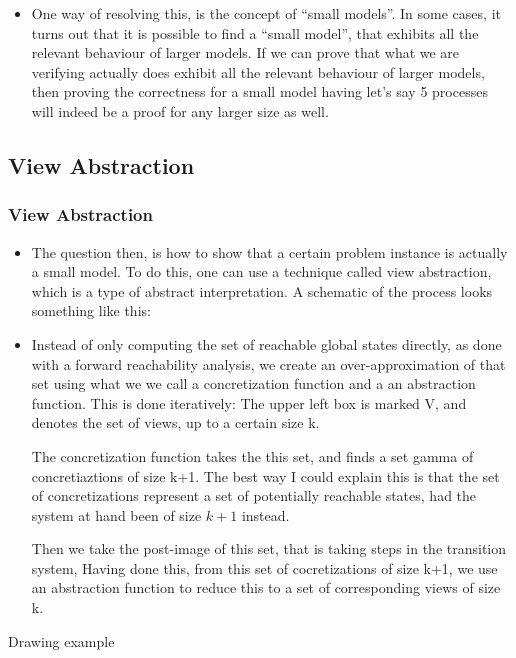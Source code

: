 \documentclass[handout]{beamer}
\begin{document}
\begin{footnotesize}
\begin{frame}
\begin{itemize}
\item
    One way of resolving this, is the concept of ``small models''. In some cases, it turns out that it is possible to find a ``small model'', that exhibits all the relevant behaviour of larger models. If we can prove that what we are verifying actually does exhibit all the relevant behaviour of larger models, then proving the correctness for a small model having let's say 5 processes will indeed be a proof for any larger size as well.

  \end{itemize}
\end{frame}

\subsection{View Abstraction}
\begin{frame}
\frametitle{View Abstraction} %

\begin{itemize}
\item
The question then, is how to show that a certain problem instance is actually a small model. To do this, one can use a technique called view abstraction, which is a type of abstract interpretation. A schematic of the process looks something like this:
\item
Instead of only computing the set of reachable global states directly, as done with a forward reachability analysis, we create an over-approximation of that set using what we we call a concretization function and a an abstraction function. This is done iteratively: The upper left box is marked V, and denotes the set of views, up to a certain size k.

The concretization function takes the this set, and finds a set gamma of concretiaztions of size k+1. The best way I could explain this is that the set of concretizations represent a set of potentially reachable states, had the system at hand been of size $k+1$ instead.

Then we take the post-image of this set, that is taking steps in the transition system,
Having done this, from this set of cocretizations of size k+1, we use an abstraction function to reduce this to a set of corresponding views of size k.

\end{itemize}
\end{frame}

\begin{frame}
Drawing example
\end{frame}


\end{footnotesize}
\end{document}
